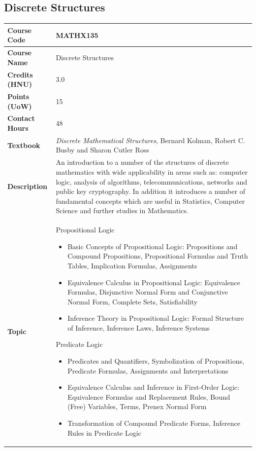 \documentclass{article}
\begin{document}
\subsection[MATHX135 Discrete Structures]{Discrete Structures}
\renewcommand{\arraystretch}{1.5} %
\begin{longtable}{|p{3cm}|p{10cm}|}
\hline
\textbf{Course Code} & MATHX135 \\
\hline
\textbf{Course Name} & Discrete Structures\\
\hline
\textbf{Credits (HNU)} & 3.0 \\
\hline
\textbf{Points (UoW)} & 15 \\
\hline
\textbf{Contact Hours} & 48 \\
\hline
\textbf{Textbook} & \emph{Discrete Mathematical Structures}, Bernard Kolman, Robert C. Busby and Sharon Cutler Ross\\
\hline
\textbf{Description} & An introduction to a number of the structures of discrete mathematics with wide applicability in areas such as: computer logic, analysis of algorithms, telecommunications, networks and public key cryptography. In addition it introduces a number of fundamental concepts which are useful in Statistics, Computer Science and further studies in Mathematics. \\
\hline
\textbf{Topic} & 
Propositional Logic
\begin{itemize}
    \item Basic Concepts of Propositional Logic: Propositions and Compound Propositions, Propositional Formulas and Truth Tables, Implication Formulas, Assignments
    \item Equivalence Calculus in Propositional Logic: Equivalence Formulas, Disjunctive Normal Form and Conjunctive Normal Form, Complete Sets, Satisfiability
    \item Inference Theory in Propositional Logic: Formal Structure of Inference, Inference Laws, Inference Systems
\end{itemize}

Predicate Logic
\begin{itemize}
    \item Predicates and Quantifiers, Symbolization of Propositions, Predicate Formulas, Assignments and Interpretations
    \item Equivalence Calculus and Inference in First-Order Logic: Equivalence Formulas and Replacement Rules, Bound (Free) Variables, Terms, Prenex Normal Form
    \item Transformation of Compound Predicate Forms, Inference Rules in Predicate Logic
\end{itemize}


\end{longtable}
\end{document}
